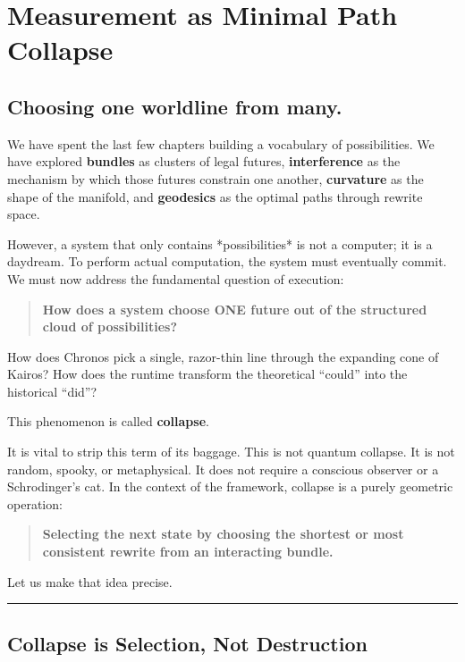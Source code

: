 \chapter{Measurement as Minimal Path Collapse}

\section{\texorpdfstring{\textbf{Choosing one worldline from many.}}{13.1 --- Choosing one worldline from many.}}

We have spent the last few chapters building a vocabulary of possibilities. We have explored \textbf{bundles} as clusters of legal futures, \textbf{interference} as the mechanism by which those futures constrain one another, \textbf{curvature} as the shape of the manifold, and \textbf{geodesics} as the optimal paths through rewrite space.

However, a system that only contains *possibilities* is not a computer; it is a daydream. To perform actual computation, the system must eventually commit. We must now address the fundamental question of execution:

\begin{quote}
\textbf{How does a system choose ONE future out of the structured cloud of possibilities?}
\end{quote}

How does Chronos pick a single, razor-thin line through the expanding cone of Kairos? How does the runtime transform the theoretical ``could'' into the historical ``did''?

This phenomenon is called \textbf{collapse}.

It is vital to strip this term of its baggage. This is not quantum collapse. It is not random, spooky, or metaphysical. It does not require a conscious observer or a Schrodinger's cat. In the context of the \COMPUTER{} framework, collapse is a purely geometric operation:

\begin{quote}
\textbf{Selecting the next state by choosing the shortest or most consistent rewrite from an interacting bundle.}
\end{quote}

Let us make that idea precise.

\begin{center}\rule{0.5\linewidth}{0.5pt}\end{center}

\section{\texorpdfstring{\textbf{Collapse is Selection, Not Destruction}}{13.2 --- Collapse is Selection, Not Destruction}}

